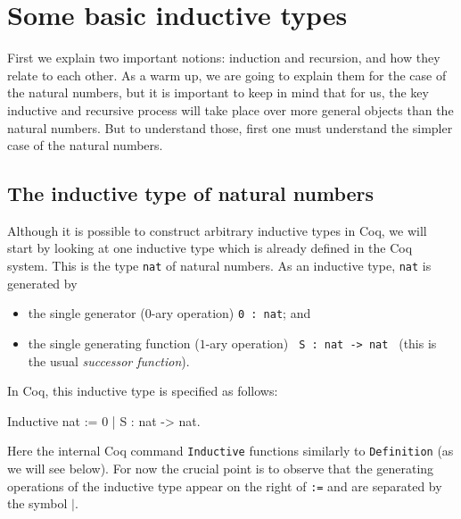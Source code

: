 
\section{Some basic inductive types} 
\label{sec:inductive}


First we explain two important notions: induction
and recursion, and how they relate to each other. As a warm up,
we are going to explain them for the case of the natural numbers,
but it is important to keep in mind that for us, the key inductive
and recursive process will take place over more general objects
than the natural numbers. But to understand those, first one
must understand the simpler case of the natural numbers.


\subsection{The inductive type of natural numbers}\label{sec:induction}

Although it is possible to construct arbitrary inductive types in Coq,
we will start by looking at one inductive type which is already
defined in the Coq system.  This is the type \verb|nat| of
natural numbers.  As an inductive type, \verb|nat| is generated
by 
\begin{itemize}
\item the single generator ($0$-ary operation) \verb|0 : nat|; and
\item the single generating function ($1$-ary operation) 
  \verb| S : nat -> nat | (this is the usual \emph{successor function}).
\end{itemize}
In Coq, this inductive type is specified as follows:
\begin{center}
  \begin{coqcode}
Inductive nat := 0 | S : nat -> nat.
  \end{coqcode}
\end{center}
Here the internal Coq command \verb|Inductive| functions
similarly to \verb|Definition| (as we will see below).  For now
the crucial point is to observe that the generating operations of the
inductive type appear on the right of \verb|:=| and are separated
by the symbol $|$.


